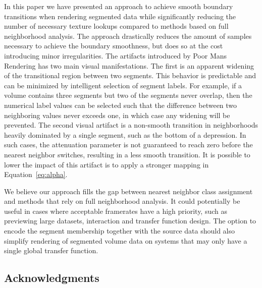 \documentclass{egpubl}
\begin{document}
In this paper we have presented an approach to achieve smooth boundary transitions when rendering segmented data while significantly reducing the number of necessary texture lookups compared to methods based on full neighborhood analysis. The approach drastically reduces the amount of samples necessary to achieve the boundary smoothness, but does so at the cost introducing minor irregularities. The artifacts introduced by Poor Mans Rendering has two main visual manifestations. The first is an apparent widening of the transitional region between two segments. This behavior is predictable and can be minimized by intelligent selection of segment labels. For example, if a volume contains three segments but two of the segments never overlap, then the numerical label values can be selected such that the difference between two neighboring values never exceeds one, in which case any widening will be prevented. The second visual artifact is a non-smooth transition in neighborhoods heavily dominated by a single segment, such as the bottom of a depression. In such cases, the attenuation parameter is not guaranteed to reach zero before the nearest neighbor switches, resulting in a less smooth transition. It is possible to lower the impact of this artifact is to apply a stronger mapping in Equation~\ref{eq:alpha}.

We believe our approach fills the gap between nearest neighbor class assignment and methods that rely on full neighborhood analysis. It could potentially be useful in cases where acceptable framerates have a high priority, such as previewing large datasets, interaction and transfer function design. The option to encode the segment membership together with the source data should also simplify rendering of segmented volume data on systems that may only have a single global transfer function. 


\subsection{Acknowledgments}
\end{document}
